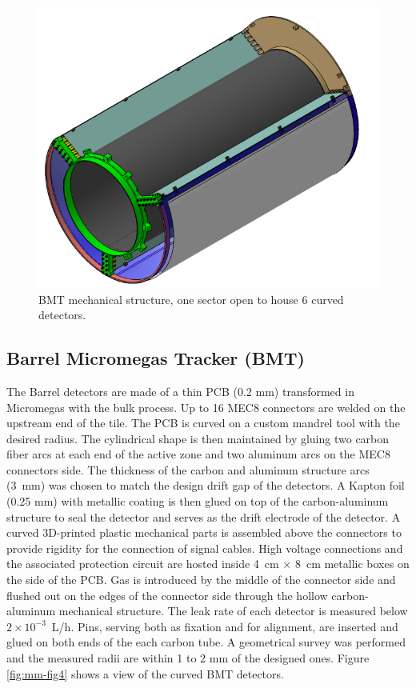 \begin{figure}[htb]
 \includegraphics[width=1.0\columnwidth,keepaspectratio]{images/fig3}
 \caption{BMT mechanical structure, one sector open to house 6 curved detectors.}
 \label{fig:mm-fig3}
\end{figure}


\subsection{Barrel Micromegas Tracker (BMT)}

The Barrel detectors are made of a thin PCB (0.2 mm) transformed in Micromegas with the bulk process. Up to 16 MEC8 connectors 
are welded on the upstream end of the tile. The PCB is curved on a custom mandrel tool with the desired radius. The cylindrical shape is then maintained by gluing two carbon fiber arcs at each end of the active zone and two aluminum arcs on the MEC8 connectors side. The thickness of the carbon and aluminum structure arcs (3~mm) was chosen to match the design drift gap of the detectors.
A Kapton foil (0.25 mm) with metallic coating is then glued on top of the carbon-aluminum structure to seal the detector and serves as the drift electrode of the detector. A curved 3D-printed plastic mechanical parts is assembled above 
the connectors to provide rigidity for the connection of signal cables.  High voltage connections and the associated protection circuit are hosted inside 4~cm $\times$ 8~cm metallic boxes on the side of the PCB.  Gas is introduced by the middle of the connector side and flushed out on the edges of the connector side through the hollow carbon-aluminum mechanical structure. The leak rate of each detector is measured below \(2\times10^{-3}\)~L/h. Pins, serving both as fixation and for alignment, are inserted and glued on both ends of the each carbon tube. A geometrical survey was performed and the measured radii are within 1 to 2 mm of the designed ones. Figure \ref{fig:mm-fig4} shows a view of the curved BMT detectors.

